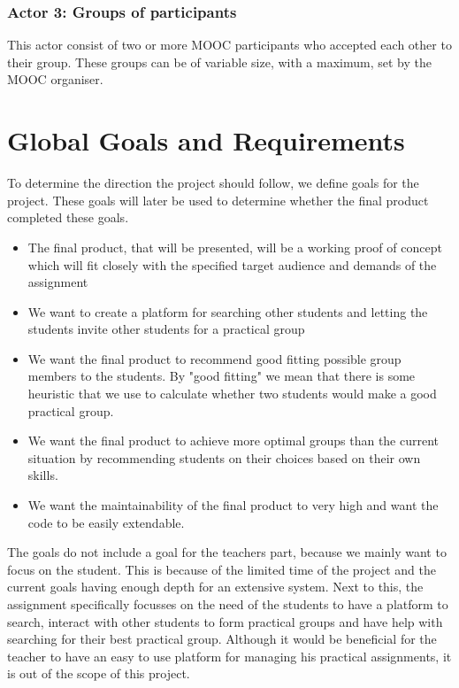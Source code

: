 \subsubsection{Actor 3: Groups of participants}
This actor consist of two or more MOOC participants who accepted each other to their group.
These groups can be of variable size, with a maximum, set by the MOOC organiser.

\section{Global Goals and Requirements}
To determine the direction the project should follow, we define goals for the project.
These goals will later be used to determine whether the final product completed these goals.
\begin{itemize}
\item The final product, that will be presented, will be a working proof of concept which will fit closely with the specified target audience and demands of the assignment
\item We want to create a platform for searching other students and letting the students invite other students for a practical group
\item We want the final product to recommend good fitting possible group members to the students. By "good fitting" we mean that there is some heuristic that we use to calculate whether two students would make a good practical group.
\item We want the final product to achieve more optimal groups than the current situation by recommending students on their choices based on their own skills.
\item We want the maintainability of the final product to very high and want the code to be easily extendable.
\end{itemize}

The goals do not include a goal for the teachers part, because we mainly want to focus on the student.
This is because of the limited time of the project and the current goals having enough depth for an extensive system.
Next to this, the assignment specifically focusses on the need of the students to have a platform to search, interact with other students to form practical groups and have help with searching for their best practical group.
Although it would be beneficial for the teacher to have an easy to use platform for managing his practical assignments, it is out of the scope of this project.

